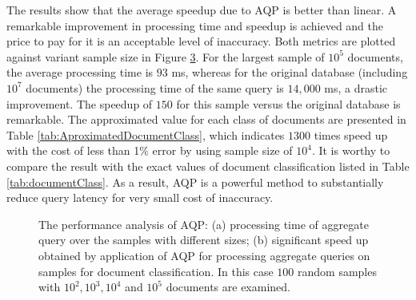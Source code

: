 The results show that the average speedup due to AQP is better than linear. A remarkable improvement in processing time and speedup is achieved and the price to pay for it is an acceptable level of inaccuracy. Both metrics are plotted against variant sample size in Figure \ref{fig:performance}. For the largest sample of $10^5$ documents, the average processing time is $93$ ms, whereas for the original database (including $10^7$ documents) the processing time of the same query is $14,000$ ms, a drastic improvement. The speedup of $150$ for this sample versus  the original database is remarkable. The approximated value for each class of documents are presented in Table \ref{tab:AproximatedDocumentClass}, which indicates $1300$ times speed up with the cost of less than 1\% error by using sample size of $10^4$. It is worthy to compare the result with the exact values of document classification listed in Table \ref{tab:documentClass}. As a result, AQP is a powerful method to substantially reduce query latency for very small cost of inaccuracy.  
 
\begin{figure}[H]
\begin{subfigure}{0.40\textwidth}
\centering
\resizebox{1.0\textwidth}{!}{}
\label{fig:runTime}
\caption{}
\end{subfigure}
\qquad 
\begin{subfigure}{0.5\textwidth}
\resizebox{1.0\textwidth}{!}{}
\label{fig:speedup}
\caption{}
\end{subfigure}
\caption{The performance analysis of AQP: (a) processing time of aggregate query over the samples with different sizes; (b) significant speed up obtained by application of AQP for processing aggregate queries on samples for document classification. In this case $100$ random samples with $10^2, 10^3, 10^4$ and $10^5$ documents are examined.}
\label{fig:performance}
\end{figure}


